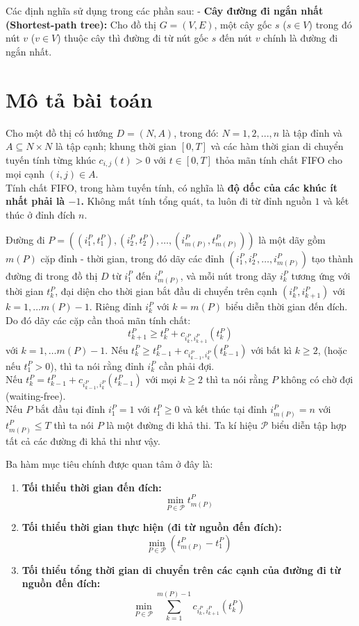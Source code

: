 \documentclass[../main.tex]{subfiles}
\begin{document}
Các định nghĩa sử dụng trong các phần sau: - \textbf{Cây đường đi ngắn
nhất (Shortest-path tree):} Cho đồ thị \(G=(V,E)\), một cây gốc \(s\)
(\(s\in V\)) trong đó nút \(v\) (\(v\in V\)) thuộc cây thì đường đi từ
nút gốc \(s\) đến nút \(v\) chính là đường đi ngắn nhất.

\section{Mô tả bài toán}\label{problem-description}

Cho một đồ thị có hướng \(D = (N, A)\), trong đó: \(N = {1, 2, ..., n}\)
là tập đỉnh và \(A \subseteq N \times N\) là tập cạnh; khung thời gian
\([0, T]\) và các hàm thời gian di chuyển tuyến tính từng khúc
\(c_{i,j}(t) > 0\) với \(t \in [0, T]\) thỏa mãn tính chất FIFO cho mọi
cạnh \((i, j) \in A\).\\
Tính chất FIFO, trong hàm tuyến tính, có nghĩa là
\textbf{độ dốc của các khúc ít nhất phải là \(-1\).} Không mất tính tổng
quát, ta luôn đi từ đỉnh nguồn \(1\) và kết thúc ở đỉnh đích
\(n\).

Đường đi
\(P=((i_1^P, t_1^P), (i_2^P, t_2^P), \dots, (i_{m(P)}^P, t_{m(P)}^P))\)
là một dãy gồm \(m(P)\) cặp đỉnh - thời gian, trong đó dãy các đỉnh
\((i_1^P, i_2^P, \dots, i_{m(P)}^P)\) tạo thành đường đi trong đồ thị
\(D\) từ \(i_1^P\) đến \(i_{m(P)}^P\), và mỗi nút trong dãy \(i_k^P\)
tương ứng với thời gian \(t_k^P\), đại diện cho thời gian bắt đầu di
chuyển trên cạnh \((i_k^P, i_{k+1}^P)\) với \(k=1, \dots m(P)-1\). Riêng
đỉnh \(i_k^P\) với \(k=m(P)\) biểu diễn thời gian đến đích. Do đó dãy
các cặp cần thoả mãn tính chất:
\[t_{k+1}^P \ge t_k^P + c_{i_k^P, i_{k+1}^P}(t_k^P)\] với
\(k=1, \dots m(P)-1\). Nếu
\(t_{k}^P \ge t_{k-1}^P + c_{i_{k-1}^P, i_{k}^P}(t_{k-1}^P)\) với bất kì
\(k \ge 2\), (hoặc nếu \(t_1^P > 0\)), thì ta nói rằng đỉnh \(i_k^P\)
cần phải đợi.\\ 
Nếu \(t_{k}^P = t_{k-1}^P + c_{i_{k-1}^P, i_{k}^P}(t_{k-1}^P)\) với mọi
\(k \ge 2\) thì ta nói rằng \(P\) không có chờ đợi (waiting-free). \\
Nếu \(P\) bắt đầu tại đỉnh \(i_1^P = 1\) với \(t_1^P\ge0\) và kết thúc tại
đỉnh \(i_{m(P)}^P=n\) với \(t_{m(P)}^P \le T\) thì ta nói \(P\) là một
đường đi khả thi. Ta kí hiệu \(\mathcal{P}\) biểu diễn tập hợp tất cả các
đường đi khả thi như vậy.

Ba hàm mục tiêu chính được quan tâm ở đây là:

\begin{enumerate}
\def\labelenumi{\arabic{enumi}.}
\tightlist
\item
  \textbf{Tối thiểu thời gian đến đích:}
  \[\min_{P\in \mathcal P}t_{m(P)}^P\]
\item
  \textbf{Tối thiểu thời gian thực hiện (đi từ nguồn đến đích):}
  \[\min_{P\in \mathcal P}(t_{m(P)}^P-t_1^P)\]
\item
  \textbf{Tối thiểu tổng thời gian di chuyển trên các cạnh của đường đi
  từ nguồn đến đích:}
  \[\min_{P\in \mathcal P}\sum_{k=1}^{m(P)-1}c_{i_k^P, i_{k+1}^P}(t_k^P)\]
\end{enumerate}
\end{document}
